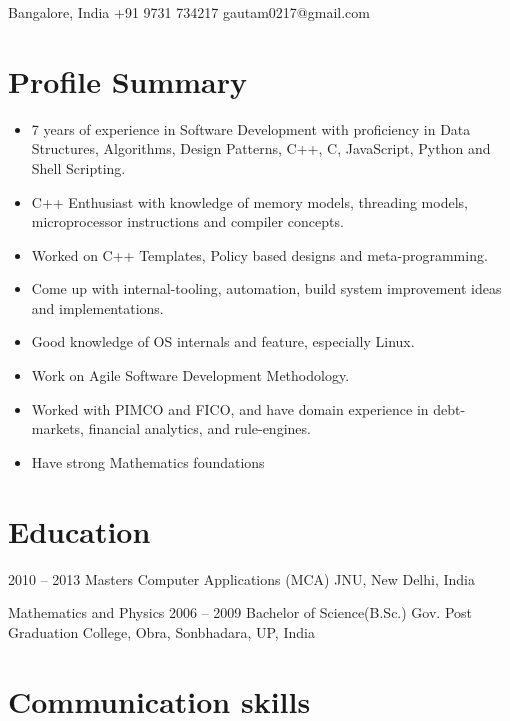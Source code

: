 \personal
    {Bangalore, India}
    {+91 9731 734217}
    {gautam0217@gmail.com}
    
\section{Profile Summary}
\begin{itemize}
    \item{7 years of experience in Software Development with proficiency in Data Structures, Algorithms, Design Patterns, C++, C, JavaScript, Python and Shell Scripting.}
    \item{C++ Enthusiast with knowledge of memory models, threading models, microprocessor instructions and compiler concepts.}
    \item{Worked on C++ Templates, Policy based designs and meta-programming.}
    \item{Come up with internal-tooling, automation, build system improvement ideas and implementations.}
    \item{Good knowledge of OS internals and feature, especially Linux.}
    \item{Work on Agile Software Development Methodology.}
    \item{Worked with PIMCO and FICO, and have domain experience in debt-markets, financial
analytics, and rule-engines.}
    \item{Have strong Mathematics foundations}
\end{itemize}

\section{Education}

\begin{yearlist}

\item {2010 -- 2013}
     {Masters Computer Applications (MCA)}
     {JNU, New Delhi, India}

\item[Mathematics and Physics]{2006 -- 2009}
    {Bachelor of Science(B.Sc.)}
    {Gov. Post Graduation College, Obra, Sonbhadara, UP, India}

\end{yearlist}

\section{Communication skills}

